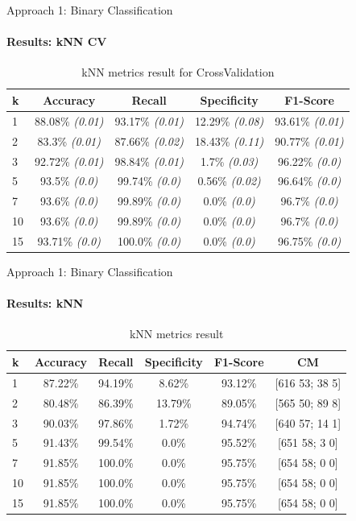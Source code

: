 \documentclass[9pt, pstricks, xcolor=dvipsnames]{beamer}
\begin{document}
\begin{frame}{Approach 1: Binary Classification}
\framesubtitle{Results: kNN CV}
\begin{table}[H]
    \centering
    \begin{tabular}{lcccc}
        \toprule
        k          & Accuracy                & Recall                   & Specificity               & F1-Score  \\
        \midrule
        1 & 88.08\% \textit{(0.01)} & 93.17\% \textit{(0.01)} & 12.29\% \textit{(0.08)} & 93.61\% \textit{(0.01)} \\
        2 & 83.3\% \textit{(0.01)} & 87.66\% \textit{(0.02)} & 18.43\% \textit{(0.11)} & 90.77\% \textit{(0.01)} \\
        3 & 92.72\% \textit{(0.01)} & 98.84\% \textit{(0.01)} & 1.7\% \textit{(0.03)} & 96.22\% \textit{(0.0)} \\
        5 & 93.5\% \textit{(0.0)} & 99.74\% \textit{(0.0)} & 0.56\% \textit{(0.02)} & 96.64\% \textit{(0.0)} \\
        7 & 93.6\% \textit{(0.0)} & 99.89\% \textit{(0.0)} & 0.0\% \textit{(0.0)} & 96.7\% \textit{(0.0)} \\
        10 & 93.6\% \textit{(0.0)} & 99.89\% \textit{(0.0)} & 0.0\% \textit{(0.0)} & 96.7\% \textit{(0.0)} \\
        15 & 93.71\% \textit{(0.0)} & 100.0\% \textit{(0.0)} & 0.0\% \textit{(0.0)} & 96.75\% \textit{(0.0)} \\

        \bottomrule
    \end{tabular}
    \caption{kNN metrics result for CrossValidation}
    \label{tab:kNN_CV_approach1}
\end{table}
\end{frame}
\begin{frame}{Approach 1: Binary Classification}
\framesubtitle{Results: kNN}
\begin{table}[H]
    \centering
    \begin{tabular}{lccccc}
        \toprule
        k & Accuracy & Recall & Specificity & F1-Score & CM \\
        \midrule
        1 & 87.22\%  & 94.19\%  & 8.62\%  & 93.12\% & [616 53; 38 5] \\
        2 & 80.48\%  & 86.39\%  & 13.79\%  & 89.05\% & [565 50; 89 8] \\
        3 & 90.03\%  & 97.86\%  & 1.72\%  & 94.74\% & [640 57; 14 1] \\
        5 & 91.43\%  & 99.54\%  & 0.0\%  & 95.52\% & [651 58; 3 0] \\
        7 & 91.85\%  & 100.0\%  & 0.0\%  & 95.75\% & [654 58; 0 0] \\
        10 & 91.85\%  & 100.0\%  & 0.0\%  & 95.75\% & [654 58; 0 0] \\
        15 & 91.85\%  & 100.0\%  & 0.0\%  & 95.75\% & [654 58; 0 0] \\
        \bottomrule
    \end{tabular}
    \caption{kNN metrics result}
    \label{tab:kNN_approach1}
\end{table}
\end{frame}
\end{document}
